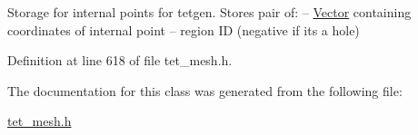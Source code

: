 Storage for internal points for tetgen. Stores pair of\+: -- \hyperlink{classoomph_1_1Vector}{Vector} containing coordinates of internal point -- region ID (negative if it\textquotesingle{}s a hole) 

Definition at line 618 of file tet\+\_\+mesh.\+h.



The documentation for this class was generated from the following file\+:\begin{DoxyCompactItemize}
\item 
\hyperlink{tet__mesh_8h}{tet\+\_\+mesh.\+h}\end{DoxyCompactItemize}
